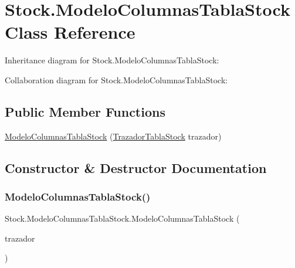 \hypertarget{class_stock_1_1_modelo_columnas_tabla_stock}{}\section{Stock.\+Modelo\+Columnas\+Tabla\+Stock Class Reference}
\label{class_stock_1_1_modelo_columnas_tabla_stock}


Inheritance diagram for Stock.\+Modelo\+Columnas\+Tabla\+Stock\+:


Collaboration diagram for Stock.\+Modelo\+Columnas\+Tabla\+Stock\+:
\subsection*{Public Member Functions}
\begin{DoxyCompactItemize}
\item 
\mbox{\hyperlink{class_stock_1_1_modelo_columnas_tabla_stock_a8856fdceec2c8de97965596c58fbf56c}{Modelo\+Columnas\+Tabla\+Stock}} (\mbox{\hyperlink{class_stock_1_1_trazador_tabla_stock}{Trazador\+Tabla\+Stock}} trazador)
\end{DoxyCompactItemize}


\subsection{Constructor \& Destructor Documentation}
\mbox{\label{class_stock_1_1_modelo_columnas_tabla_stock_a8856fdceec2c8de97965596c58fbf56c}} 
\subsubsection{\texorpdfstring{Modelo\+Columnas\+Tabla\+Stock()}{ModeloColumnasTablaStock()}}
{\footnotesize\ttfamily Stock.\+Modelo\+Columnas\+Tabla\+Stock.\+Modelo\+Columnas\+Tabla\+Stock (\begin{DoxyParamCaption}\item[{\mbox{\hyperlink{class_stock_1_1_trazador_tabla_stock}{Trazador\+Tabla\+Stock}}}]{trazador }\end{DoxyParamCaption})\hspace{0.3cm}{\ttfamily [inline]}}

